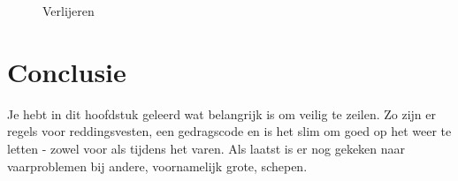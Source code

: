 \begin{center}
\begin{minipage}[b]{0.25\textwidth}
\begin{figure}[H]
        \caption{Verlijeren}
        \label{pic:verlijeren}
    \end{figure}
  \end{minipage}
  \end{center}


\section{Conclusie}
Je hebt in dit hoofdstuk geleerd wat belangrijk is om veilig te zeilen. Zo zijn er regels voor reddingsvesten, een gedragscode en is het slim om goed op het weer te letten - zowel voor als tijdens het varen. Als laatst is er nog gekeken naar vaarproblemen bij andere, voornamelijk grote, schepen.